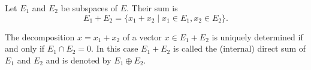 Let $E_1$ and $E_2$ be subspaces of $E$. Their sum is
$$E_1 + E_2 = \{x_1 + x_2 \mid x_1 \in E_1, x_2 \in E_2\}.$$

The decomposition $x = x_1 + x_2$ of a vector $x \in E_1 + E_2$ is uniquely determined if and only if $E_1 \cap E_2 = 0$. In this case $E_1 + E_2$ is called the (internal) direct sum of $E_1$ and $E_2$ and is denoted by $E_1 \oplus E_2$.
